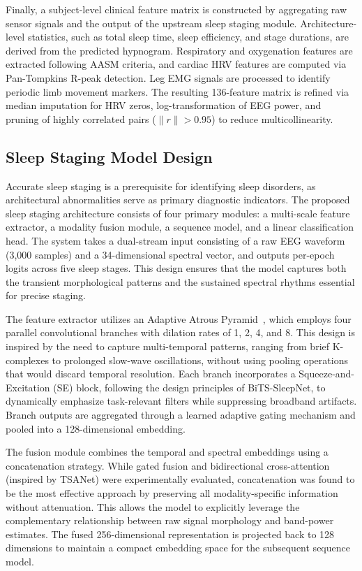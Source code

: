 \documentclass{ieeetj}
\begin{document}
Finally, a subject-level clinical feature matrix is constructed by aggregating raw sensor signals and the output of the upstream sleep staging module. Architecture-level statistics, such as total sleep time, sleep efficiency, and stage durations, are derived from the predicted hypnogram. Respiratory and oxygenation features are extracted following AASM criteria, and cardiac HRV features are computed via Pan-Tompkins R-peak detection. Leg EMG signals are processed to identify periodic limb movement markers. The resulting 136-feature matrix is refined via median imputation for HRV zeros, log-transformation of EEG power, and pruning of highly correlated pairs ($\|r\| > 0.95$) to reduce multicollinearity.

\subsection{Sleep Staging Model Design}
Accurate sleep staging is a prerequisite for identifying sleep disorders, as architectural abnormalities serve as primary diagnostic indicators. The proposed sleep staging architecture consists of four primary modules: a multi-scale feature extractor, a modality fusion module, a sequence model, and a linear classification head. The system takes a dual-stream input consisting of a raw EEG waveform (3,000 samples) and a 34-dimensional spectral vector, and outputs per-epoch logits across five sleep stages. This design ensures that the model captures both the transient morphological patterns and the sustained spectral rhythms essential for precise staging.

The feature extractor utilizes an Adaptive Atrous Pyramid~\cite{sun2025adg}, which employs four parallel convolutional branches with dilation rates of 1, 2, 4, and 8. This design is inspired by the need to capture multi-temporal patterns, ranging from brief K-complexes to prolonged slow-wave oscillations, without using pooling operations that would discard temporal resolution. Each branch incorporates a Squeeze-and-Excitation (SE) block, following the design principles of BiTS-SleepNet, to dynamically emphasize task-relevant filters while suppressing broadband artifacts. Branch outputs are aggregated through a learned adaptive gating mechanism and pooled into a 128-dimensional embedding.

The fusion module combines the temporal and spectral embeddings using a concatenation strategy. While gated fusion and bidirectional cross-attention (inspired by TSANet) were experimentally evaluated, concatenation was found to be the most effective approach by preserving all modality-specific information without attenuation. This allows the model to explicitly leverage the complementary relationship between raw signal morphology and band-power estimates. The fused 256-dimensional representation is projected back to 128 dimensions to maintain a compact embedding space for the subsequent sequence model.
\end{document}

